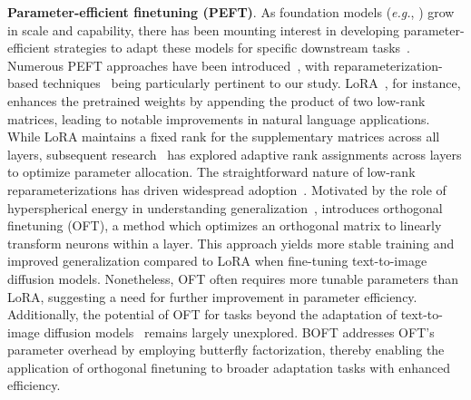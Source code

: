\textbf{Parameter-efficient finetuning (PEFT)}. As foundation models (\emph{e.g.}, \cite{brown2020language,radford2021learning,rombach2022high,kirillov2023segment}) grow in scale and capability, there has been mounting interest in developing parameter-efficient strategies to adapt these models for specific downstream tasks~\cite{treviso2023efficient,ding2023parameter,lialin2023scaling}. Numerous PEFT approaches have been introduced~\cite{houlsby2019parameter,aghajanyan2020intrinsic,hulora2022,edalati2022krona,wang2022adamix,gheini2021cross,zaken2022bitfit,guo2020parameter,sung2021training,ansell2022composable,lester2021power,li2021prefix,vu2022spot,he2021towards,mao2021unipelt,karimi2021compacter,liu2022few,sung2022lst,chen2022parameter,jia2022visual,chen2022adaptformer,zhang2022neural,jie2023fact,lian2022scaling,luo2023towards}, with reparameterization-based techniques~\cite{aghajanyan2020intrinsic,hulora2022,edalati2022krona} being particularly pertinent to our study. LoRA~\cite{hulora2022}, for instance, enhances the pretrained weights by appending the product of two low-rank matrices, leading to notable improvements in natural language applications. While LoRA maintains a fixed rank for the supplementary matrices across all layers, subsequent research~\cite{zhang2022adaptive,valipour2022dylora,zhang2023increlora} has explored adaptive rank assignments across layers to optimize parameter allocation. The straightforward nature of low-rank reparameterizations has driven widespread adoption~\cite{dettmers2023qlora,zi2023delta,chavan2023one}. Motivated by the role of hyperspherical energy in understanding generalization~\cite{liu2018learning,liu2021orthogonal}, \cite{qiu2023controlling} introduces orthogonal finetuning (OFT), a method which optimizes an orthogonal matrix to linearly transform neurons within a layer. This approach yields more stable training and improved generalization compared to LoRA when fine-tuning text-to-image diffusion models. Nonetheless, OFT often requires more tunable parameters than LoRA, suggesting a need for further improvement in parameter efficiency. Additionally, the potential of OFT for tasks beyond the adaptation of text-to-image diffusion models~\cite{qiu2023controlling} remains largely unexplored. BOFT addresses OFT’s parameter overhead by employing butterfly factorization, thereby enabling the application of orthogonal finetuning to broader adaptation tasks with enhanced efficiency.

